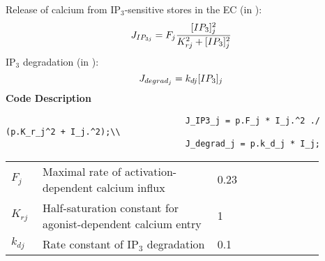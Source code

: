 \documentclass[fleqn]{report}
\numberwithin{equation}{section}
\numberwithin{equation}{section}
\begin{document}
 									Release of calcium from IP$_{3}$-sensitive stores in the EC (in \uMps):
 									\begin{equation} \label{eq:JIP3j}
 									J_{IP_{3j}} = F_{j}\frac{[IP_{3}]_{j}^{2}}{K_{rj}^{2}+[IP_{3}]_{j}^{2}}
 									\end{equation}
 									IP$_{3}$ degradation (in \uMs):  
 			 									\begin{equation} \label{eq:Jdegradj}
 									 									J_{degrad_{j}}= k_{dj} [IP_{3}]_{j}
							 					\end{equation}
 									\textbf{Code Description}
 									\begin{verbatim}
 									J_IP3_j = p.F_j * I_j.^2 ./ (p.K_r_j^2 + I_j.^2);\\
 									J_degrad_j = p.k_d_j * I_j;
 									\end{verbatim}
 									\begin{table}[h!]
 									\centering
 									\begin{tabular}{ p{0.09\linewidth}  >{\footnotesize} p{0.5\linewidth}  >{\footnotesize} p{0.27\linewidth} >{\footnotesize} p{0.03\linewidth} }
 									\hline
 									 $F_{j}$      			& Maximal rate of activation-dependent calcium influx			& 0.23 \uMps	& \cite{Koenigsberger2006} \\
 									$K_{rj}$				& Half-saturation constant for agonist-dependent calcium entry	& 1 \uM	 & \cite{Koenigsberger2006} \\
 										$k_{dj}$      			& Rate constant of IP$_{3}$ degradation						 		& 0.1 \pers		& \cite{Koenigsberger2006} \\
 									\hline
 									\end{tabular}
 									\label{tab:IP3j}
 									\end{table}
\end{document}
